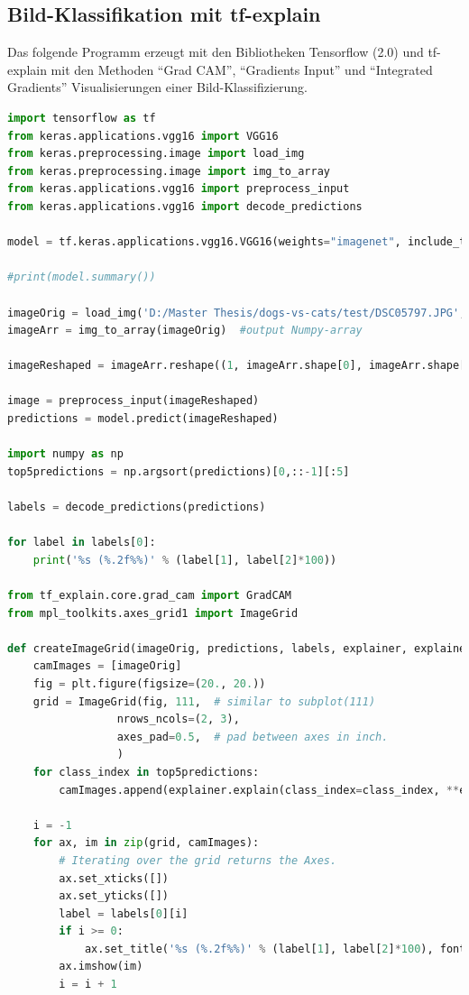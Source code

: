 \documentclass[
  12pt, %
  a4paper, %
  oneside, %
  openany, 
  numbers=noenddot, %
  BCOR=5mm, %
  parskip=half*, %
  thesis, %
]{bfhbook}
\begin{document}
\subsection*{Bild-Klassifikation mit tf-explain}
Das folgende Programm erzeugt mit den Bibliotheken Tensorflow (2.0) und tf-explain mit den Methoden ``Grad CAM'', ``Gradients Input''  und ``Integrated Gradients'' Visualisierungen einer Bild-Klassifizierung. 
\begin{lstlisting}[language=Python, caption=Visualisiertes Neuronales Netz mit Tensorflow und tf-explain]
import tensorflow as tf
from keras.applications.vgg16 import VGG16
from keras.preprocessing.image import load_img
from keras.preprocessing.image import img_to_array
from keras.applications.vgg16 import preprocess_input
from keras.applications.vgg16 import decode_predictions

model = tf.keras.applications.vgg16.VGG16(weights="imagenet", include_top=True)

#print(model.summary())

imageOrig = load_img('D:/Master Thesis/dogs-vs-cats/test/DSC05797.JPG', target_size=(224, 224))
imageArr = img_to_array(imageOrig)  #output Numpy-array

imageReshaped = imageArr.reshape((1, imageArr.shape[0], imageArr.shape[1], imageArr.shape[2]))

image = preprocess_input(imageReshaped)
predictions = model.predict(imageReshaped)

import numpy as np
top5predictions = np.argsort(predictions)[0,::-1][:5]

labels = decode_predictions(predictions)

for label in labels[0]:
    print('%s (%.2f%%)' % (label[1], label[2]*100))
    
from tf_explain.core.grad_cam import GradCAM
from mpl_toolkits.axes_grid1 import ImageGrid

def createImageGrid(imageOrig, predictions, labels, explainer, explainerArgs):
    camImages = [imageOrig]
    fig = plt.figure(figsize=(20., 20.))
    grid = ImageGrid(fig, 111,  # similar to subplot(111)
                 nrows_ncols=(2, 3),
                 axes_pad=0.5,  # pad between axes in inch.
                 )
    for class_index in top5predictions:
        camImages.append(explainer.explain(class_index=class_index, **explainerArgs))
    
    i = -1
    for ax, im in zip(grid, camImages):
        # Iterating over the grid returns the Axes.
        ax.set_xticks([])
        ax.set_yticks([])
        label = labels[0][i]
        if i >= 0:
            ax.set_title('%s (%.2f%%)' % (label[1], label[2]*100), fontsize=20)
        ax.imshow(im)
        i = i + 1


\end{lstlisting}
\end{document}
